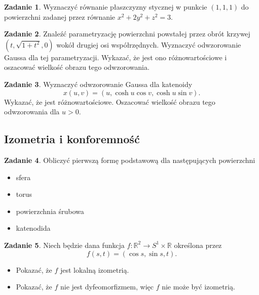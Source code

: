 \documentclass[a4paper,11pt]{article}
\theoremstyle{definition}\newtheorem{exercise}{Zadanie}
\theoremstyle{definition}\newtheorem{remark}{Uwaga}
\begin{document}
\begin{exercise}
 Wyznaczyć r\'ownanie płaszczyzny stycznej w punkcie $(1,1,1)$
 do powierzchni zadanej przez r\'ownanie $x^2+2y^2+z^2=3$.
\end{exercise}

\begin{exercise}
Znaleźć parametryzację powierzchni powstałej przez obrót krzywej 
$(t,\sqrt{1+t^{2}},0)$ wokół drugiej osi współrzędnych. Wyznaczyć odwzorowanie 
Gaussa dla tej parametryzacji. Wykazać, że jest ono różnowartościowe i 
oszacować wielkość obrazu tego odwzorowania.
\end{exercise}


\begin{exercise}
Wyznaczyć odwzorowanie Gaussa dla katenoidy 
\[x(u,v)=(u,\cosh{u}\cos{v},\cosh{u}\sin{v}).\]
Wykazać, że jest różnowartościowe. Oszacować wielkość obrazu tego odwzorowania 
dla $u>0$.
\end{exercise}

\subsection{Izometria i konforemność}

\begin{exercise}
 Obliczyć pierwszą formę podstawową dla następujących powierzchni
 \begin{itemize}
  \item sfera
 \item torus
\item powierzchnia śrubowa
\item katenodida
 \end{itemize}

 \end{exercise}
 
 \begin{exercise}
Niech będzie dana funkcja $f\colon \mathbb{R}^2 \to S^1 \times \mathbb{R}$ 
określona przez \[f(s,t)=(\cos s, \sin s, t).\]
\begin{itemize}
 \item Pokazać, że $f$ jest lokalną izometrią.
 \item Pokazać, że $f$ nie jest dyfeomorfizmem, więc $f$ nie może być izometrią.
\end{itemize}
 
\end{exercise}
 
\end{document}
